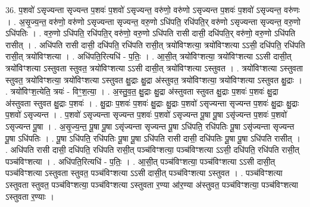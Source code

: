 \documentclass[17pt]{extarticle}
\begin{document}
36. प॒शवो॑ ऽसृज्यन्ता सृज्यन्त प॒शवः॑ प॒शवो॑ ऽसृज्यन्त॒ वरु॑णो॒ वरु॑णो ऽसृज्यन्त प॒शवः॑ प॒शवो॑ ऽसृज्यन्त॒ वरु॑णः । . अ॒सृ॒ज्य॒न्त॒ वरु॑णो॒ वरु॑णो ऽसृज्यन्ता सृज्यन्त॒ वरु॒णो ऽधि॑पति॒ रधि॑पति॒र् वरु॑णो ऽसृज्यन्ता सृज्यन्त॒ वरु॒णो ऽधि॑पतिः । . वरु॒णो ऽधि॑पति॒ रधि॑पति॒र् वरु॑णो॒ वरु॒णो ऽधि॑पति रासी दासी॒ दधि॑पति॒र् वरु॑णो॒ वरु॒णो ऽधि॑पति रासीत् । . अधि॑पति रासी दासी॒ दधि॑पति॒ रधि॑पति रासी॒त् त्रयो॑विꣳशत्या॒ त्रयो॑विꣳशत्या ऽऽसी॒ दधि॑पति॒ रधि॑पति रासी॒त् त्रयो॑विꣳशत्या । . अधि॑पति॒रित्यधि॑ - प॒तिः॒ । . आ॒सी॒त् त्रयो॑विꣳशत्या॒ त्रयो॑विꣳशत्या ऽऽसी दासी॒त् त्रयो॑विꣳशत्या ऽस्तुवता स्तुवत॒ त्रयो॑विꣳशत्या ऽऽसी दासी॒त् त्रयो॑विꣳशत्या ऽस्तुवत । . त्रयो॑विꣳशत्या ऽस्तुवता स्तुवत॒ त्रयो॑विꣳशत्या॒ त्रयो॑विꣳशत्या ऽस्तुवत क्षु॒द्राः क्षु॒द्रा अ॑स्तुवत॒ त्रयो॑विꣳशत्या॒ त्रयो॑विꣳशत्या ऽस्तुवत क्षु॒द्राः । . त्रयो॑विꣳश॒त्येति॒ त्रयः॑ - विꣳ॒॒श॒त्या॒ । . अ॒स्तु॒व॒त॒ क्षु॒द्राः क्षु॒द्रा अ॑स्तुवता स्तुवत क्षु॒द्राः प॒शवः॑ प॒शवः॑ क्षु॒द्रा अ॑स्तुवता स्तुवत क्षु॒द्राः प॒शवः॑ । . क्षु॒द्राः प॒शवः॑ प॒शवः॑ क्षु॒द्राः क्षु॒द्राः प॒शवो॑ ऽसृज्यन्ता सृज्यन्त प॒शवः॑ क्षु॒द्राः क्षु॒द्राः प॒शवो॑ ऽसृज्यन्त । . प॒शवो॑ ऽसृज्यन्ता सृज्यन्त प॒शवः॑ प॒शवो॑ ऽसृज्यन्त पू॒षा पू॒षा ऽसृ॑ज्यन्त प॒शवः॑ प॒शवो॑ ऽसृज्यन्त पू॒षा । . अ॒सृ॒ज्य॒न्त॒ पू॒षा पू॒षा ऽसृ॑ज्यन्ता सृज्यन्त पू॒षा ऽधि॑पति॒ रधि॑पतिः पू॒षा ऽसृ॑ज्यन्ता सृज्यन्त पू॒षा ऽधि॑पतिः । . पू॒षा ऽधि॑पति॒ रधि॑पतिः पू॒षा पू॒षा ऽधि॑पति रासी दासी॒ दधि॑पतिः पू॒षा पू॒षा ऽधि॑पति रासीत् । . अधि॑पति रासी दासी॒ दधि॑पति॒ रधि॑पति रासी॒त् पञ्च॑विꣳशत्या॒ पञ्च॑विꣳशत्या ऽऽसी॒ दधि॑पति॒ रधि॑पति रासी॒त् पञ्च॑विꣳशत्या । . अधि॑पति॒रित्यधि॑ - प॒तिः॒ । . आ॒सी॒त् पञ्च॑विꣳशत्या॒ पञ्च॑विꣳशत्या ऽऽसी दासी॒त् पञ्च॑विꣳशत्या ऽस्तुवता स्तुवत॒ पञ्च॑विꣳशत्या ऽऽसी दासी॒त् पञ्च॑विꣳशत्या ऽस्तुवत । . पञ्च॑विꣳशत्या ऽस्तुवता स्तुवत॒ पञ्च॑विꣳशत्या॒ पञ्च॑विꣳशत्या ऽस्तुवता र॒ण्या आ॑र॒ण्या अ॑स्तुवत॒ पञ्च॑विꣳशत्या॒ पञ्च॑विꣳशत्या ऽस्तुवता र॒ण्याः । \newline
\end{document}

